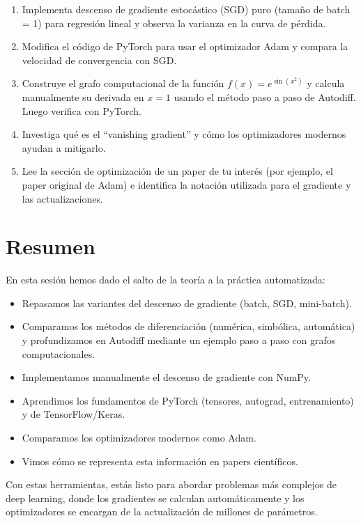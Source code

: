 \documentclass[12pt,a4paper,openany,oneside]{book}
\begin{document}
\begin{enumerate}
    \item Implementa descenso de gradiente estocástico (SGD) puro (tamaño de batch = 1) para regresión lineal y observa la varianza en la curva de pérdida.
    \item Modifica el código de PyTorch para usar el optimizador Adam y compara la velocidad de convergencia con SGD.
    \item Construye el grafo computacional de la función $f(x) = e^{\sin(x^2)}$ y calcula manualmente su derivada en $x=1$ usando el método paso a paso de Autodiff. Luego verifica con PyTorch.
    \item Investiga qué es el ``vanishing gradient'' y cómo los optimizadores modernos ayudan a mitigarlo.
    \item Lee la sección de optimización de un paper de tu interés (por ejemplo, el paper original de Adam) e identifica la notación utilizada para el gradiente y las actualizaciones.
\end{enumerate}

\section{Resumen}

En esta sesión hemos dado el salto de la teoría a la práctica automatizada:
\begin{itemize}
    \item Repasamos las variantes del descenso de gradiente (batch, SGD, mini-batch).
    \item Comparamos los métodos de diferenciación (numérica, simbólica, automática) y profundizamos en Autodiff mediante un ejemplo paso a paso con grafos computacionales.
    \item Implementamos manualmente el descenso de gradiente con NumPy.
    \item Aprendimos los fundamentos de PyTorch (tensores, autograd, entrenamiento) y de TensorFlow/Keras.
    \item Comparamos los optimizadores modernos como Adam.
    \item Vimos cómo se representa esta información en papers científicos.
\end{itemize}
Con estas herramientas, estás listo para abordar problemas más complejos de deep learning, donde los gradientes se calculan automáticamente y los optimizadores se encargan de la actualización de millones de parámetros.
\end{document}
